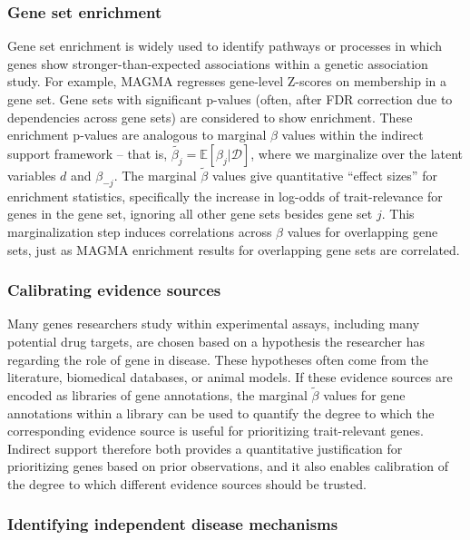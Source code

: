 \subsubsection{Gene set enrichment}
Gene set enrichment is widely used to identify pathways or processes
in which genes show stronger-than-expected associations within a
genetic association study. For example, MAGMA regresses gene-level
Z-scores on membership in a gene set. Gene sets with significant
p-values (often, after FDR correction due to dependencies across gene
sets) are considered to show enrichment. These enrichment p-values are
analogous to marginal $\beta$ values within the indirect support
framework -- that is, $\tilde{\beta_j} = \mathbb{E}\left[\beta_j|\mathcal{D}\right]$, where we
marginalize over the latent variables $d$ and $\beta_{-j}$. The
marginal $\tilde{\beta}$ values give quantitative ``effect sizes'' for
enrichment statistics, specifically the increase in log-odds of
trait-relevance for genes in the gene set, ignoring all other gene
sets besides gene set $j$. This marginalization step induces
correlations across $\beta$ values for overlapping gene sets, just as
MAGMA enrichment results for 
overlapping gene sets are correlated.

\subsubsection{Calibrating evidence sources}
Many genes researchers study within experimental assays, including
many potential drug targets, are chosen based on a hypothesis the
researcher has regarding the role of gene in disease. These hypotheses
often come from the literature, biomedical
databases, or animal models. If these evidence sources are encoded as
libraries of gene annotations, the marginal $\tilde{\beta}$ values for gene annotations
within a library can be used to quantify the degree to which the
corresponding evidence source is useful for prioritizing
trait-relevant genes. Indirect support therefore both provides a
quantitative justification for prioritizing genes based on prior
observations, and it also enables calibration of the degree to which
different evidence sources should be trusted.

\subsubsection{Identifying independent disease mechanisms}

